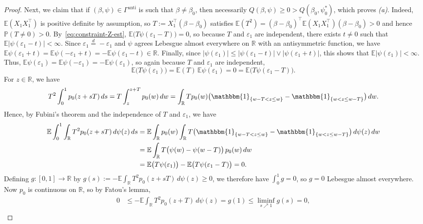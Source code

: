 \documentclass[a4paper]{article}
\newcommand{\R}{\mathbb{R}}
\newcommand{\E}{\mathbb{E}}
\renewcommand{\Pr}{\mathbb{P}}
\newcommand{\Ind}{\mathbbm{1}}
\newcommand{\eqd}{\overset{d}{=}}
\theoremstyle{definition}
\begin{document}
\begin{proof}
Next, we claim that if $(\beta,\psi) \in \Gamma^{\mathrm{anti}}$ is such that $\beta \neq \beta_0$, then necessarily $Q(\beta,\psi) \geq 0 > Q(\beta_0,\psi_0^*)$, which proves \emph{(a)}. Indeed, $\E(X_1 X_1^\top)$ is positive definite by assumption, so $T := X_1^\top (\beta - \beta_0)$ satisfies $\E(T^2) = (\beta - \beta_0)^\top \E(X_1 X_1^\top) (\beta - \beta_0) > 0$ and hence $\Pr(T \neq 0) > 0$. By~\eqref{eq:constraint-Z-est}, $\E\bigl(T\psi(\varepsilon_1 - T)\bigr) = 0$, so because $T$ and $\varepsilon_1$ are independent, there exists $t \neq 0$ such that $\E|\psi(\varepsilon_1 - t)| < \infty$. Since $\varepsilon_1 \eqd -\varepsilon_1$ and $\psi$ agrees Lebesgue almost everywhere on $\R$ with an antisymmetric function, we have $\E\psi(\varepsilon_1 + t) = \E\psi(-\varepsilon_1 + t) = -\E\psi(\varepsilon_1 - t) \in \R$. Finally, since $|\psi(\varepsilon_1)| \leq |\psi(\varepsilon_1 - t)| \vee |\psi(\varepsilon_1 + t)|$, this shows that $\E|\psi(\varepsilon_1)| < \infty$. Thus, $\E\psi(\varepsilon_1) = \E\psi(-\varepsilon_1) = -\E\psi(\varepsilon_1)$, so again because $T$ and $\varepsilon_1$ are independent,
\begin{equation}
\label{eq:non-identifiable}
\E\bigl(T\psi(\varepsilon_1)\bigr) = \E(T)\,\E\psi(\varepsilon_1) = 0 = \E\bigl(T\psi(\varepsilon_1 - T)\bigr).
\end{equation}
For $z \in \R$, we have
\[
T^2\int_0^1 p_0(z + sT)\,ds = T\int_z^{z + T} p_0(w)\,dw = \int_\R Tp_0(w)\bigl(\Ind_{\{w - T < z \leq w\}} - \Ind_{\{w < z \leq w - T\}}\bigr)\,dw.
\]
Hence, by Fubini's theorem and the independence of $T$ and $\varepsilon_1$, we have
\begin{align*}
\E\int_0^1 \int_\R T^2 p_0(z + sT)\,d\psi(z)\,ds &= \E\int_\R p_0(w)\int_\R T\bigl(\Ind_{\{w - T < z \leq w\}} - \Ind_{\{w < z \leq w - T\}}\bigr)\,d\psi(z)\,dw \\
&= \E \int_\R T\bigl(\psi(w) - \psi(w - T)\bigr)\,p_0(w)\,dw \\
&= \E\bigl(T\psi(\varepsilon_1)\bigr) - \E\bigl(T\psi(\varepsilon_1 - T)\bigr) = 0.
\end{align*}
Defining $g \colon [0,1] \to \R$ by $g(s) := -\E \int_\R T^2 p_0(z + sT)\,d\psi(z) \geq 0$, we therefore have $\int_0^1 g = 0$, so $g = 0$ Lebesgue almost everywhere. Now $p_0$ is continuous on $\R$, so by Fatou's lemma,
\begin{align}
\label{eq:joint-min-deriv-1}
0 &\leq -\E \int_\R T^2 p_0(z + T)\,d\psi(z) = g(1) \leq \liminf_{s \nearrow 1} g(s) = 0, \\
\label{eq:joint-min-deriv-2}

\end{align}
\end{proof}
\end{document}
